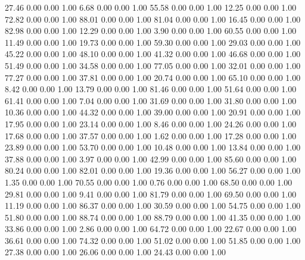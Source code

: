    27.46   0.00   0.00   1.00
    6.68   0.00   0.00   1.00
   55.58   0.00   0.00   1.00
   12.25   0.00   0.00   1.00
   72.82   0.00   0.00   1.00
   88.01   0.00   0.00   1.00
   81.04   0.00   0.00   1.00
   16.45   0.00   0.00   1.00
   82.98   0.00   0.00   1.00
   12.29   0.00   0.00   1.00
    3.90   0.00   0.00   1.00
   60.55   0.00   0.00   1.00
   11.49   0.00   0.00   1.00
   19.73   0.00   0.00   1.00
   59.30   0.00   0.00   1.00
   29.03   0.00   0.00   1.00
   45.22   0.00   0.00   1.00
   48.10   0.00   0.00   1.00
   41.32   0.00   0.00   1.00
   46.68   0.00   0.00   1.00
   51.49   0.00   0.00   1.00
   34.58   0.00   0.00   1.00
   77.05   0.00   0.00   1.00
   32.01   0.00   0.00   1.00
   77.27   0.00   0.00   1.00
   37.81   0.00   0.00   1.00
   20.74   0.00   0.00   1.00
   65.10   0.00   0.00   1.00
    8.42   0.00   0.00   1.00
   13.79   0.00   0.00   1.00
   81.46   0.00   0.00   1.00
   51.64   0.00   0.00   1.00
   61.41   0.00   0.00   1.00
    7.04   0.00   0.00   1.00
   31.69   0.00   0.00   1.00
   31.80   0.00   0.00   1.00
   10.36   0.00   0.00   1.00
   44.32   0.00   0.00   1.00
   39.00   0.00   0.00   1.00
   20.91   0.00   0.00   1.00
   17.95   0.00   0.00   1.00
   23.14   0.00   0.00   1.00
    8.46   0.00   0.00   1.00
   24.26   0.00   0.00   1.00
   17.68   0.00   0.00   1.00
   37.57   0.00   0.00   1.00
    1.62   0.00   0.00   1.00
   17.28   0.00   0.00   1.00
   23.89   0.00   0.00   1.00
   53.70   0.00   0.00   1.00
   10.48   0.00   0.00   1.00
   13.84   0.00   0.00   1.00
   37.88   0.00   0.00   1.00
    3.97   0.00   0.00   1.00
   42.99   0.00   0.00   1.00
   85.60   0.00   0.00   1.00
   80.24   0.00   0.00   1.00
   82.01   0.00   0.00   1.00
   19.36   0.00   0.00   1.00
   56.27   0.00   0.00   1.00
    1.35   0.00   0.00   1.00
   70.55   0.00   0.00   1.00
    0.76   0.00   0.00   1.00
   68.50   0.00   0.00   1.00
   29.81   0.00   0.00   1.00
    9.41   0.00   0.00   1.00
   81.79   0.00   0.00   1.00
   69.50   0.00   0.00   1.00
   11.19   0.00   0.00   1.00
   86.37   0.00   0.00   1.00
   30.59   0.00   0.00   1.00
   54.75   0.00   0.00   1.00
   51.80   0.00   0.00   1.00
   88.74   0.00   0.00   1.00
   88.79   0.00   0.00   1.00
   41.35   0.00   0.00   1.00
   33.86   0.00   0.00   1.00
    2.86   0.00   0.00   1.00
   64.72   0.00   0.00   1.00
   22.67   0.00   0.00   1.00
   36.61   0.00   0.00   1.00
   74.32   0.00   0.00   1.00
   51.02   0.00   0.00   1.00
   51.85   0.00   0.00   1.00
   27.38   0.00   0.00   1.00
   26.06   0.00   0.00   1.00
   24.43   0.00   0.00   1.00
